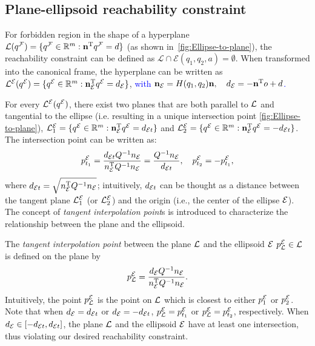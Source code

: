 \documentclass[10pt,twocolumn,twoside]{IEEEtran}
\newcommand{\new}[1]{\textcolor{blue}{#1}}
\newcommand{\news}{\color{blue}}
\begin{document}
\subsection{Plane-ellipsoid reachability constraint}\label{sec:ellipsoide-plane}

For forbidden region in the shape of a hyperplane $\mathcal{L}({q^{\mathcal{F}}}) = \{{q^{\mathcal{F}}}\in\mathbb{R}^m: \mathbf{n}^\mathrm{T} {q^{\mathcal{F}}} = d\}$ (as shown in~\cref{fig:Ellipse-to-plane}), the reachability constraint can be defined as $\mathcal{L} \cap \mathcal{E}(q_1,q_2,a) = \emptyset$. When transformed into the canonical frame, the hyperplane can be written as ${\mathcal{L}^{\mathcal{E}}}({q^{\mathcal{E}}}) = \{  {q^{\mathcal{E}}}\in\mathbb{R}^m:  \mathbf{n}_{\mathcal{E}}^\mathrm{T} {q^{\mathcal{E}}} = d_{\mathcal{E}}\}$, \new{with $\mathbf{n}_{\mathcal{E}} = H(q_1,q_2)\mathbf{n}, \quad d_{\mathcal{E}} =-\mathbf{n}^\mathrm{T} o + d$.}

For every ${\mathcal{L}^{\mathcal{E}}}({q^{\mathcal{E}}})$, there exist two planes that are both parallel to $\mathcal{L}$ and tangential to the ellipse (i.e. resulting in a unique intersection point \cref{fig:Ellipse-to-plane}), $\mathcal{L}_1^{\mathcal{E}} = \{{q^{\mathcal{E}}}\in\mathbb{R}^m: \mathbf{n}_{\mathcal{E}} ^\mathrm{T} {q^{\mathcal{E}}} =  d_{\mathcal{E} t} \}$ and $\mathcal{L}_2^{\mathcal{E}} = \{{q^{\mathcal{E}}}\in\mathbb{R}^m: \mathbf{n}_{\mathcal{E}} ^\mathrm{T} {q^{\mathcal{E}}} = - d_{\mathcal{E} t} \}$. The intersection point can be written as:
\begin{equation}
    p^{\mathcal{E}}_{t_{1}} = \frac{ d_{\mathcal{E} t} Q^{-1}   n_{\mathcal{E}}}{ n_{\mathcal{E}} ^\mathrm{T} Q^{-1}  n_{\mathcal{E}}} = \frac{Q^{-1} n_{\mathcal{E}}}{ d_{\mathcal{E} t}},\quad  p^{\mathcal{E}}_{t_{2}} = -  p^{\mathcal{E}}_{t_{1}},
\end{equation}
where $d_{\mathcal{E} t} = \sqrt{ n_{\mathcal{E}}^\mathrm{T} Q^{-1} n_{\mathcal{E}}}$; intuitively, $d_{\mathcal{E} t}$ can be thought as a distance between the tangent plane $\mathcal{L}_1^{\mathcal{E}}$ (or $\mathcal{L}_2^{\mathcal{E}}$) and the origin (i.e., the center of the ellipse $\mathcal{E}$). The concept of \emph{tangent interpolation point}s is introduced to characterize the relationship between the plane and the ellipsoid.

\begin{definition}
The \emph{tangent interpolation point} {\news between the plane $\mathcal{L}$ and the ellipsoid $\mathcal{E}$} $p^{\mathcal{E}}_{\mathcal{L}} \in \mathcal{L}$ is defined on the plane by 
    \begin{equation}\label{equ:ProjectPoint}
      p^{\mathcal{E}}_{\mathcal{L}} = \frac{ d_{\mathcal{E}} Q^{-1} n_{\mathcal{E}}}{ n_{\mathcal{E}}^\mathrm{T} Q^{-1} n_{\mathcal{E}}}.
    \end{equation}
  Intuitively, the point $p^{\mathcal{E}}_{\mathcal{L}}$ is the point on $\mathcal{L}$ which is closest to either $p^{\mathcal{E}}_1$ or $p^{\mathcal{E}}_2$.
  Note that when  $d_{\mathcal{E}}=d_{\mathcal{E} t}$ or $d_{\mathcal{E}}=-d_{\mathcal{E} t}$, $p^{\mathcal{E}}_{\mathcal{L}}=p^{\mathcal{E}}_{t_1}$ or $p^{\mathcal{E}}_{\mathcal{L}}=p^{\mathcal{E}}_{t_2}$, respectively. When $ d_{\mathcal{E}} \in [- d_{\mathcal{E} t},  d_{\mathcal{E} t}]$, the plane $\mathcal{L}$ and the ellipsoid $\mathcal{E}$ have at least one intersection, thus violating our desired reachability constraint. 
\end{definition}
\end{document}
